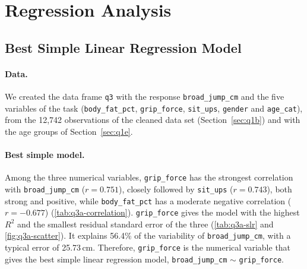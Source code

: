 \section{Regression Analysis}\label{sec:q3}

\subsection{Best Simple Linear Regression Model}\label{sec:q3a}


\paragraph{Data.}
We created the data frame \texttt{q3} with the response \texttt{broad\_jump\_cm} and the five variables of the task (\texttt{body\_fat\_pct}, \texttt{grip\_force}, \texttt{sit\_ups}, \texttt{gender} and \texttt{age\_cat}), from the 12,742 observations of the cleaned data set (Section~\ref{sec:q1b}) and with the age groups of Section~\ref{sec:q1e}.

\paragraph{Best simple model.}
Among the three numerical variables, \texttt{grip\_force} has the strongest correlation with \texttt{broad\_jump\_cm} ($r = 0.751$), closely followed by \texttt{sit\_ups} ($r = 0.743$), both strong and positive, while \texttt{body\_fat\_pct} has a moderate negative correlation ($r = -0.677$) (\autoref{tab:q3a-correlation}).
\texttt{grip\_force} gives the model with the highest $R^2$ and the smallest residual standard error of the three (\autoref{tab:q3a-slr} and \autoref{fig:q3a-scatter}).
It explains 56.4\% of the variability of \texttt{broad\_jump\_cm}, with a typical error of 25.73\,cm.
Therefore, \texttt{grip\_force} is the numerical variable that gives the best simple linear regression model, \texttt{broad\_jump\_cm} $\sim$ \texttt{grip\_force}.


